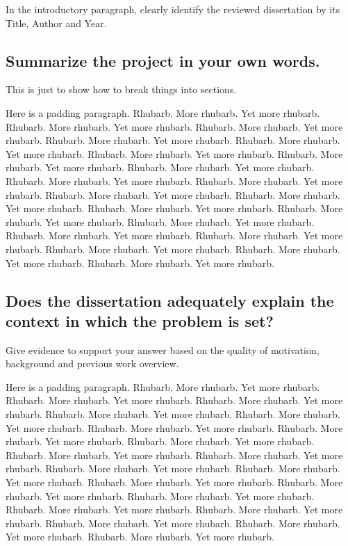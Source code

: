 \documentclass{article}
\begin{document}
In the introductory paragraph, clearly identify the reviewed dissertation by its Title, Author and Year.

\subsection*{Summarize the project in your own words.}

This is just to show how to break things into sections.

Here is a padding paragraph.  Rhubarb.  More rhubarb.  Yet more rhubarb. 
Rhubarb.  More rhubarb.  Yet more rhubarb.  Rhubarb.  More rhubarb.  Yet
more rhubarb.  Rhubarb.  More rhubarb.  Yet more rhubarb.  Rhubarb. 
More rhubarb.  Yet more rhubarb.  Rhubarb.  More rhubarb.  Yet more
rhubarb.  Rhubarb.  More rhubarb.  Yet more rhubarb.  Rhubarb.  More
rhubarb.  Yet more rhubarb.  Rhubarb.  More rhubarb.  Yet more rhubarb. 
Rhubarb.  More rhubarb.  Yet more rhubarb.  Rhubarb.  More rhubarb.  Yet
more rhubarb.  Rhubarb.  More rhubarb.  Yet more rhubarb.  Rhubarb. 
More rhubarb.  Yet more rhubarb.  Rhubarb.  More rhubarb.  Yet more
rhubarb.  Rhubarb.  More rhubarb.  Yet more rhubarb.   Rhubarb.  More
rhubarb.  Yet more rhubarb.   Rhubarb.  More rhubarb.  Yet more
rhubarb.  Rhubarb.  More rhubarb.  Yet more rhubarb.    Rhubarb.  More
rhubarb.  Yet more rhubarb.  Rhubarb.  More rhubarb.  Yet more rhubarb. 

\subsection*{Does the dissertation adequately explain the context in which the problem is set?}

Give evidence to support your answer based on the quality of motivation, background and previous work overview.

Here is a padding paragraph.  Rhubarb.  More rhubarb.  Yet more rhubarb. 
Rhubarb.  More rhubarb.  Yet more rhubarb.  Rhubarb.  More rhubarb.  Yet
more rhubarb.  Rhubarb.  More rhubarb.  Yet more rhubarb.  Rhubarb. 
More rhubarb.  Yet more rhubarb.  Rhubarb.  More rhubarb.  Yet more
rhubarb.  Rhubarb.  More rhubarb.  Yet more rhubarb.  Rhubarb.  More
rhubarb.  Yet more rhubarb.  Rhubarb.  More rhubarb.  Yet more rhubarb. 
Rhubarb.  More rhubarb.  Yet more rhubarb.  Rhubarb.  More rhubarb.  Yet
more rhubarb.  Rhubarb.  More rhubarb.  Yet more rhubarb.  Rhubarb. 
More rhubarb.  Yet more rhubarb.  Rhubarb.  More rhubarb.  Yet more
rhubarb.  Rhubarb.  More rhubarb.  Yet more rhubarb.   Rhubarb.  More
rhubarb.  Yet more rhubarb.   Rhubarb.  More rhubarb.  Yet more
rhubarb.  Rhubarb.  More rhubarb.  Yet more rhubarb.    Rhubarb.  More
rhubarb.  Yet more rhubarb.  Rhubarb.  More rhubarb.  Yet more rhubarb. 
\end{document}
